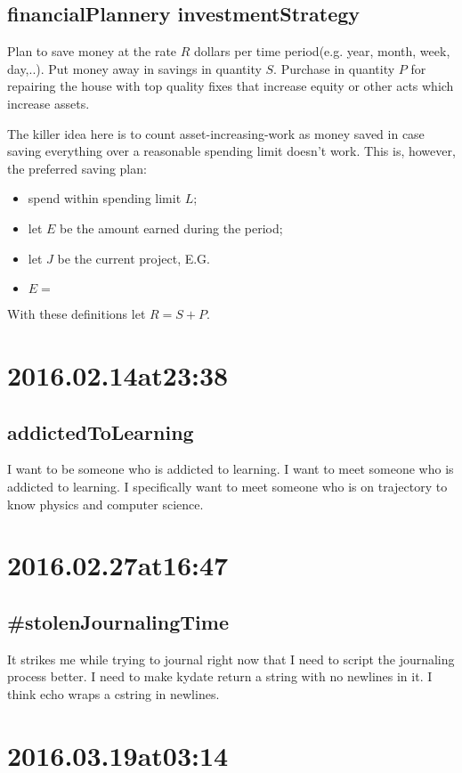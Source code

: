 \subsection*{ financialPlannery investmentStrategy }
Plan to save money at the rate $R$ dollars per time period(e.g. year, month, week, day,..). Put money away in savings in quantity $S$. Purchase in quantity $P$ for repairing the house with top quality fixes that increase equity or other acts which increase assets.

The killer idea here is to count asset-increasing-work as money saved in case saving everything over a reasonable spending limit doesn't work. This is, however, the preferred saving plan: 
\begin{itemize}
\item spend within spending limit $L$;
\item let $E$ be the amount earned during the period;
\item let $J$ be the current project, E.G. 
\item $E = $
\end{itemize}

With these definitions let $R=S+P$. 

\section*{ 2016.02.14at23:38 }
\subsection*{ addictedToLearning }
I want to be someone who is addicted to learning. I want to meet someone who is addicted to learning. I specifically want to meet someone who is on trajectory to know physics and computer science.

\section*{  2016.02.27at16:47 }
\subsection*{  \#stolenJournalingTime }
It strikes me while trying to journal right now that I need to script the journaling process better. I need to make kydate return a string with no newlines in it. I think echo wraps a cstring in newlines.
 

\section*{ 2016.03.19at03:14 }
